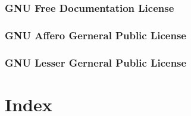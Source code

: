 \documentclass[10pt,a4paper]{book}
\begin{document}
    

\pagebreak
\section{GNU Free Documentation License}
    \label{fdl}
    

\pagebreak
\section{GNU Affero Gerneral Public License}
    \label{agpl}
    

\pagebreak
\section{GNU Lesser Gerneral Public License}
    \label{lgpl}
    

\part{Index}

\label{index}
\printindex[general]

{}
\printindex[dir]

{}
\printindex[sd]

{}
\printindex[fd]

{}
\printindex[console]

\end{document}
